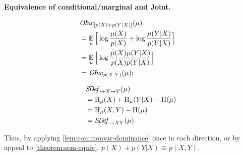 \begin{subappendices}
\begin{lproof}\label{proof:sem-equiv-properties}
    \textbf{Equivalence of conditional/marginal and Joint.}\\
    \begin{minipage}{0.5\linewidth}
    \begin{align*}
        &\mathit{O\mskip-2.5muI\mskip-3.5mun\mskip-1.7muc}_{[p(X) + p(Y|X)]}(\mu) \\
        &= \operatorname*{\mathbb{E}}_{\mu} \Big[\log \frac{\mu(X)}{p(X)} + \log \frac{\mu(Y|X)}{p(Y|X)}\Big] 
                    \\
         &= \operatorname*{\mathbb{E}}_{\mu} \Big[\log \frac{\mu(X)\mu(Y|X)}{p(X)p(Y|X)}\Big] 
                    &  \\
         &= \mathit{O\mskip-2.5muI\mskip-3.5mun\mskip-1.7muc}_{p(X,Y)}(\mu);
    \end{align*}
    \end{minipage}
    \begin{minipage}{0.5\linewidth}
        \begin{align*}
            &\mathit{S\mskip-3.5muD\mskip-2.5mue\mskip-1.5muf}_{\to X \to Y}(\mu)\\
            &= \operatorname{\mathrm{H}}_\mu(X) + \operatorname{\mathrm{H}}_\mu(Y|X) - \operatorname{\mathrm{H}}(\mu)\\
            &= \operatorname{\mathrm{H}}_\mu(X,Y) - \operatorname{\mathrm{H}}(\mu) \\
            &= \mathit{S\mskip-3.5muD\mskip-2.5mue\mskip-1.5muf}_{\to XY}(\mu).
        \end{align*}
    \end{minipage}
    Thus, by applying \cref{lem:commonvar-dominance} once in each direction, or by appeal to \cref{theorem:sem-equiv}, 
    $p(X) + p(Y|X) \equiv p(X,Y)$. 
    
    
    

\end{lproof}
\end{subappendices}
